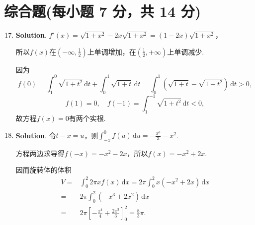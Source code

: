 \documentclass[../main.tex]{subfiles}
\begin{document}
\section{综合题(每小题 7 分，共 14 分)}
\begin{enumerate}
    \setcounter{enumi}{16}
    \item \textbf{Solution}. $f'(x)=\sqrt{1+x^{2}}-2x\sqrt{1+x^{2}}=(1-2x)\sqrt{1+x^{2}}$，

          所以$f(x)$在$\left(-\infty,\frac{1}{2}\right)$上单调增加，在$\left(\frac{1}{2}
              ,+\infty\right)$上单调减少.

          因为
          \[
              f(0)=\int_{1}^{0}\sqrt{1+t^{2}}\,\mathrm{d}t+\int_{0}^{1}\sqrt{1+t}\,\mathrm{d}
              t=\int_{0}^{1}\left(\sqrt{1+t}-\sqrt{1+t^{2}}\right)\,\mathrm{d}t>0,
          \]
          \[
              f(1)=0,\quad f(-1)=\int_{1}^{-1}\sqrt{1+t^{2}}\,\mathrm{d}t<0,
          \]
          故方程$f(x)=0$有两个实根.

    \item \textbf{Solution}. 令$t-x=u$，则$\int_{-x}^{0}f(u)\,\mathrm{d}u=-\frac{x^{3}}{3}
              -x^{2}$.

          方程两边求导得$f(-x)=-x^{2}-2x$，所以$f(x)=-x^{2}+2x$.

          因而旋转体的体积
          \[
              \begin{aligned}
                  V= {} & \int_{0}^{2}2\pi xf(x)\,\mathrm{d}x = 2\pi\int_{0}^{2}x(-x^{2}+2x)\,\mathrm{d}x \\
                  = {}  & 2\pi\int_{0}^{2}(-x^{3}+2x^{2})\,\mathrm{d}x                                    \\
                  = {}  & 2\pi\left[-\frac{x^4}{4}+\frac{2x^3}{3}\right]_{0}^{2}= \frac{8}{3}\pi.
              \end{aligned}
          \]
\end{enumerate}
\end{document}

